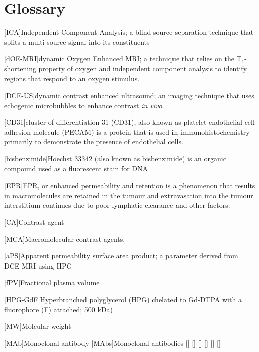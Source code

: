 
\chapter{Glossary}




\begin{acronym}

[ICA]{Independent Component Analysis; a blind source separation technique that splits a multi-source signal into its constituents}

[dOE-MRI]{dynamic Oxygen Enhanced MRI; a technique that relies on the T$_1$-shortening property of oxygen and independent component analysis to identify regions that respond to an oxygen stimulus.}

[DCE-US]{dynamic contrast enhanced ultrasound; an imaging technique that uses echogenic microbubbles to enhance contrast \emph{in vivo}.}

[CD31]{cluster of differentiation 31 (CD31), also known as platelet endothelial cell adhesion molecule (PECAM) is a protein that is used in immunohistochemistry primarily to demonstrate the presence of endothelial cells.}

[bisbenzimide]{Hoechst 33342 (also known as bisbenzimide) is an organic compound used as a fluorescent stain for DNA}

[EPR]{EPR, or enhanced permeability and retention is a phenomenon that results in macromolecules are retained in the tumour and extravasation into the tumour interstitium continues due to poor lymphatic clearance and other factors.}

[CA]{Contrast agent}

[MCA]{Macromolecular contrast agents.}

[aPS]{Apparent permeability surface area product; a parameter derived from DCE-MRI using HPG}

[fPV]{Fractional plasma volume}

[HPG-GdF]{Hyperbranched polyglycerol (HPG) chelated to Gd-DTPA with a fluorophore (F) attached; 500 kDa) }

[MW]{Molcular weight}

[MAb]{Monoclonal antibody}
[MAbs]{Monoclonal antibodies}
\acro{}[]{}
\acro{}[]{}
\acro{}[]{}
\acro{}[]{}
\acro{}[]{}
\acro{}[]{}



\end{acronym}

